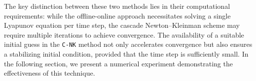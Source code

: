 \documentclass{article}
\begin{document}
The key distinction between these two methods lies in their computational requirements: while the offline-online approach necessitates solving a single Lyapunov equation per time step, the cascade Newton–Kleinman scheme may require multiple iterations to achieve convergence. The availability of a suitable initial guess in the \texttt{C-NK} method not only accelerates convergence but also ensures a stabilizing initial condition, provided that the time step is sufficiently small.
In the following section, we present a numerical experiment demonstrating the effectiveness of this technique.


\begin{algorithm}
\caption{\texttt{C-NK} SDRE}
\label{alg:CNK}{
\begin{algorithmic}[1]
\EndFor 
\end{algorithmic}}
\end{algorithm}
\end{document}
